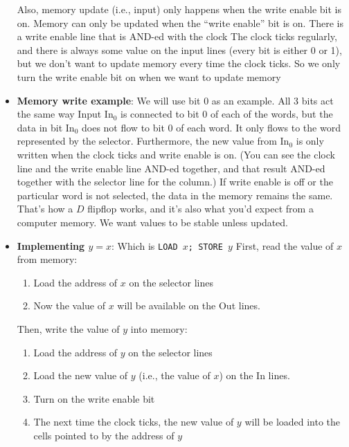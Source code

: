 \documentclass{report}
\begin{document}
\begin{itemize}
                \bigbreak \noindent 
                Also, memory update (i.e., input) only happens when the write enable bit is on.
                \bigbreak \noindent 
                Memory can only be updated when the “write enable” bit is on. There is a write enable line that is AND-ed with the clock
                \bigbreak \noindent 
                The clock ticks regularly, and there is always some value on the input lines (every bit is either 0 or 1), but we don’t want to update memory every time the clock ticks.
                \bigbreak \noindent 
                So we only turn the write enable bit on when we want to update memory
            \item \textbf{Memory write example}: We will use bit 0 as an example. All 3 bits act the same way
                \bigbreak \noindent 
                Input $\text{In}_{0}$ is connected to bit 0 of each of the words, but the data in bit $\text{In}_{0}$ does not flow to bit 0 of each word. It only flows to the word represented by the selector.
                \bigbreak \noindent 
                Furthermore, the new value from $\text{In}_{0}$ is only written when the clock ticks and write enable is on. (You can see the clock line and the write enable line AND-ed together, and that result AND-ed together with the selector line for the column.)
                \bigbreak \noindent 
                If write enable is off or the particular word is not selected, the data in the memory remains the same. That’s how a $D$ flipflop works, and it’s also what you’d expect from a computer memory. We want values to be stable unless updated.



            \item \textbf{Implementing $y=x$}: Which is \texttt{LOAD $x$; STORE $y$}
                \bigbreak \noindent 
                First,  read the value of $x$ from memory:
                \begin{enumerate}
                    \item Load the address of $x$ on the selector lines
                    \item Now the value of $x$ will be available on the Out lines.
                \end{enumerate}
                Then, write the value of $y$ into memory:
                \begin{enumerate}
                    \item Load the address of $y$ on the selector lines
                    \item Load the new value of $y$ (i.e., the value of $x$) on the In lines.
                    \item Turn on the write enable bit
                    \item The next time the clock ticks, the new value of $y$ will be loaded into the cells pointed to by the address of $y$
                \end{enumerate}


\end{itemize}
\end{document}
